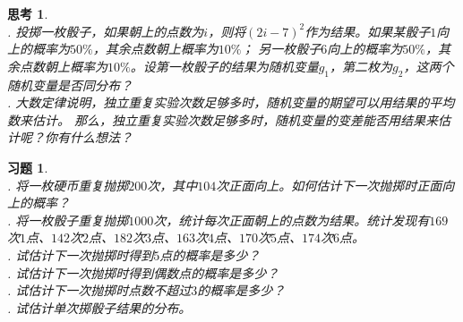 \documentclass[12pt,UTF8]{ctexbook}
\newtheorem{sk}{思考}[section]
\newtheorem{xt}{习题}[section]
\begin{document}
\begin{sk}
    \mbox{}\\
    . 投掷一枚骰子，如果朝上的点数为$i$，则将$(2i-7)^2$作为结果。如果某骰子$1$向上的概率为$50\%$，其余点数朝上概率为$10\%$；
    另一枚骰子$6$向上的概率为$50\%$，其余点数朝上概率为$10\%$。设第一枚骰子的结果为随机变量$g_1$，第二枚为$g_2$，这两个随机变量是否同分布？\\
    . 大数定律说明，独立重复实验次数足够多时，随机变量的期望可以用结果的平均数来估计。
    那么，独立重复实验次数足够多时，随机变量的变差能否用结果来估计呢？你有什么想法？
\end{sk}

\begin{xt}
    \mbox{}\\
    . 将一枚硬币重复抛掷$200$次，其中$104$次正面向上。如何估计下一次抛掷时正面向上的概率？\\
    . 将一枚骰子重复抛掷$1000$次，统计每次正面朝上的点数为结果。统计发现有$169$次$1$点、$142$次$2$点、$182$次$3$点、$163$次$4$点、$170$次$5$点、$174$次$6$点。\\
    . 试估计下一次抛掷时得到$5$点的概率是多少？\\
    . 试估计下一次抛掷时得到偶数点的概率是多少？\\
    . 试估计下一次抛掷时点数不超过$3$的概率是多少？\\
    . 试估计单次掷骰子结果的分布。
\end{xt}


\end{document}
